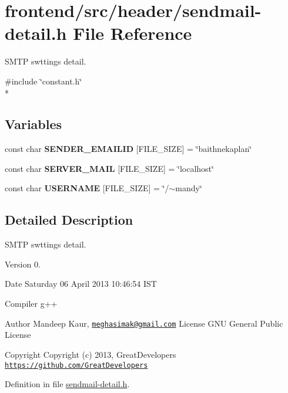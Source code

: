 \hypertarget{sendmail-detail_8h}{\section{frontend/src/header/sendmail-\/detail.h File Reference}
\label{sendmail-detail_8h}
}


S\-M\-T\-P swttings detail.  


{\ttfamily \#include \char`\"{}constant.\-h\char`\"{}}\\*
\subsection*{Variables}
\begin{DoxyCompactItemize}
\item 
\hypertarget{sendmail-detail_8h_a6a17dd6df02d3a5118873bc84ce9801d}{const char {\bfseries S\-E\-N\-D\-E\-R\-\_\-\-E\-M\-A\-I\-L\-I\-D} \mbox{[}F\-I\-L\-E\-\_\-\-S\-I\-Z\-E\mbox{]} = \char`\"{}baithnekaplan\char`\"{}}\label{sendmail-detail_8h_a6a17dd6df02d3a5118873bc84ce9801d}

\item 
\hypertarget{sendmail-detail_8h_a5a43d9760874d06771eec35419dad507}{const char {\bfseries S\-E\-R\-V\-E\-R\-\_\-\-M\-A\-I\-L} \mbox{[}F\-I\-L\-E\-\_\-\-S\-I\-Z\-E\mbox{]} = \char`\"{}localhost\char`\"{}}\label{sendmail-detail_8h_a5a43d9760874d06771eec35419dad507}

\item 
\hypertarget{sendmail-detail_8h_af0dde2cd6a9fa974836b177b410e97fe}{const char {\bfseries U\-S\-E\-R\-N\-A\-M\-E} \mbox{[}F\-I\-L\-E\-\_\-\-S\-I\-Z\-E\mbox{]} = \char`\"{}/$\sim$mandy\char`\"{}}\label{sendmail-detail_8h_af0dde2cd6a9fa974836b177b410e97fe}

\end{DoxyCompactItemize}


\subsection{Detailed Description}
S\-M\-T\-P swttings detail. \begin{DoxyVersion}{Version}
0. 
\end{DoxyVersion}
\begin{DoxyDate}{Date}
Saturday 06 April 2013 10\-:46\-:54 I\-S\-T\par
Compiler g++
\end{DoxyDate}
\begin{DoxyAuthor}{Author}
Mandeep Kaur, \href{mailto:meghasimak@gmail.com}{\tt meghasimak@gmail.\-com} License G\-N\-U General Public License 
\end{DoxyAuthor}
\begin{DoxyCopyright}{Copyright}
Copyright (c) 2013, Great\-Developers \href{https://github.com/GreatDevelopers}{\tt https\-://github.\-com/\-Great\-Developers} 
\end{DoxyCopyright}


Definition in file \hyperlink{sendmail-detail_8h_source}{sendmail-\/detail.\-h}.


